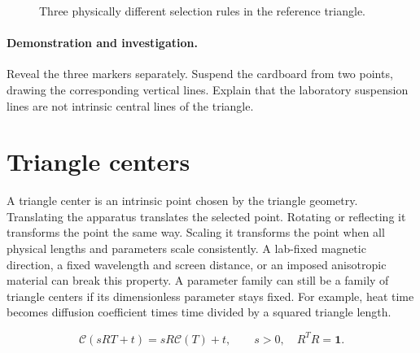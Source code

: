 \documentclass[11pt,oneside,openany]{book}
\newcommand{\TC}{\mathcal C}\newcommand{\mean}{\operatorname{mean}}
\begin{document}
\begin{figure}[htbp]\centering
{}
\caption[Three physically different selection rules in the reference triangle]{Three physically different selection rules in the reference triangle.}\label{fig:geometry-2}
\end{figure}

\paragraph{Demonstration and investigation.} Reveal the three markers separately. Suspend the cardboard from two points, drawing the corresponding vertical lines. Explain that the laboratory suspension lines are not intrinsic central lines of the triangle.


\section{Triangle centers}\label{sec:slide3}

A triangle center is an intrinsic point chosen by the triangle geometry. Translating the apparatus translates the selected point. Rotating or reflecting it transforms the point the same way. Scaling it transforms the point when all physical lengths and parameters scale consistently. A lab-fixed magnetic direction, a fixed wavelength and screen distance, or an imposed anisotropic material can break this property. A parameter family can still be a family of triangle centers if its dimensionless parameter stays fixed. For example, heat time becomes diffusion coefficient times time divided by a squared triangle length.


\[\TC(sRT+t)=sR\TC(T)+t,\qquad s>0,\quad R^TR=\mathbf1.\]
\end{document}
